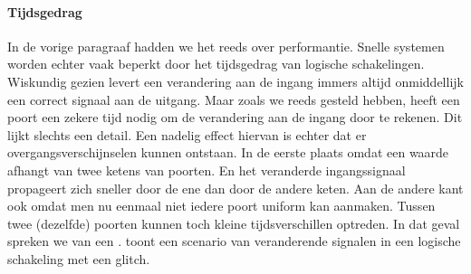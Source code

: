 \paragraph{Tijdsgedrag}In de vorige paragraaf hadden we het reeds over performantie. Snelle systemen worden echter vaak beperkt door het tijdsgedrag van logische schakelingen. Wiskundig gezien levert een verandering aan de ingang immers altijd onmiddellijk een correct signaal aan de uitgang. Maar zoals we reeds gesteld hebben, heeft een poort een zekere tijd nodig om de verandering aan de ingang door te rekenen. Dit lijkt slechts een detail. Een nadelig effect hiervan is echter dat er overgangsverschijnselen kunnen ontstaan. In de eerste plaats omdat een waarde afhangt van twee ketens van poorten. En het veranderde ingangssignaal propageert zich sneller door de ene dan door de andere keten. Aan de andere kant ook omdat men nu eenmaal niet iedere poort uniform kan aanmaken. Tussen twee (dezelfde) poorten kunnen toch kleine tijdsverschillen optreden. In dat geval spreken we van een .  toont een scenario van veranderende signalen in een logische schakeling met een glitch.
